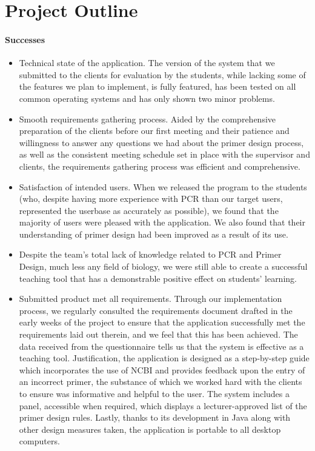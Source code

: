 \section{Project Outline}
\paragraph{Successes}
\begin{itemize}
\item Technical state of the application. The version of the system that
  we submitted to the clients for evaluation by the students, while lacking
  some of the features we plan to implement, is fully featured, has been
  tested on all common operating systems and has only shown two minor problems.
  
\item Smooth requirements gathering process. Aided by the comprehensive
  preparation of the clients before our first meeting and their patience and
  willingness to answer any questions we had about the primer design process,
  as well as the consistent meeting schedule set in place with the supervisor
  and clients, the requirements gathering process was efficient and comprehensive.

\item Satisfaction of intended users. When we released the program to the
  students (who, despite having more experience with PCR than our target users,
  represented the userbase as accurately as possible),
  we found that the majority of users were pleased with the application. We also
  found that their understanding of primer design had been improved as a result
  of its use.

\item Despite the team's total lack of knowledge related to PCR and Primer Design,
  much less any field of biology, we were still able to create a successful teaching
  tool that has a demonstrable positive effect on students' learning. 

\item Submitted product met all requirements. Through our implementation process, we
  regularly consulted the requirements document drafted in the early weeks of the
  project to ensure that the application successfully met the requirements laid out
  therein, and we feel that this has been achieved. The data received from the
  questionnaire tells us that the system is effective as a teaching tool. 
  Justification, the application is designed as a step-by-step guide which incorporates
  the use of NCBI and provides feedback upon the entry of an incorrect primer,
  the substance of which we worked hard with the clients to ensure was informative
  and helpful to the user. The system includes a panel, accessible when required,
  which displays a lecturer-approved list of the primer design rules. 
  Lastly, thanks to its development in Java along with other design measures taken,
  the application is portable to all desktop computers.
\end{itemize}

